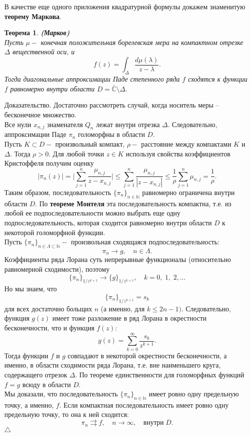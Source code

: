 \documentclass[12pt,a4paper]{article}
\theoremstyle{plain}   \newtheorem{Pro}{Задача}
\newtheorem{The}{Теорема}
\begin{document}
В качестве еще одного приложения квадратурной формулы
докажем знаменитую
{\bfseries теорему Маркова}.
\begin{The}
{\bfseries (Марков)}
\\
Пусть
$ \mu - $
конечная положительная борелевская мера на компактном отрезке
$ \Delta $
вещественной оси, и
$$
  f(z)=\int _{\Delta}
  \frac{d \mu (\lambda )}{z-\lambda}.
$$
Тогда диагональные аппроксимации Паде степенного ряда
$ f $
сходятся к функции
$ f $
равномерно внутри области
$ D= \bar{\mathbb{C}} \setminus \Delta . $
\end{The}
{\Large Доказательство.}
Достаточно рассмотреть случай, когда носитель меры --
бесконечное множество.\\
Все нули
$ x_{n,j} $
знаменателя
$ Q_n $
лежат внутри отрезка
$ \Delta . $
Следовательно, аппроксимации Паде
$ \pi _n $
голоморфны в области
$ D . $
\\
Пусть
$ K \subset D - $
произвольный компакт,
$ \rho - $
расстояние между компактами
$ K $
и
$ \Delta . $
Тогда
$ \rho >0 . $
Для любой точки
$ z \in K $
используя свойства коэффициентов Кристоффеля получим оценку
$$
  | \pi _n (z) |=
  \biggl | \sum _{j=1}^n
  \frac{\mu _{n,j}}{z-x_{n,j}} \biggr | \leq
  \sum _{j=1}^n \frac{\mu _{n,j}}{|z-x_{n,j}|} \leq
  \frac{1}{\rho} \sum _{j=1}^n \mu _{n,j} =\frac{1}{\rho}.
$$
Таким образом, последовательность
$ \{ \pi _n \} _{n \in \mathbb{N}} $
равномерно ограничена внутри области
$ D . $
По
{\bfseries теореме Монтеля}
эта последовательность компактна, т.е.
из любой ее подпоследовательности можно выбрать еще
одну подпоследовательность, которая сходится равномерно
внутри области
$ D $
к некоторой голоморфной функции.\\
Пусть
$ \{ \pi _n \} _{ n \in \Lambda \subset \mathbb{N}} - $
произвольная сходящаяся подпоследовательность:
$$
  \pi _n \rightarrow g , \quad n \in \Lambda .
$$
Коэффициенты ряда Лорана суть непрерывные функционалы
(относительно равномерной сходимости), поэтому
$$
  \{ \pi _n \} _{1/z^{k+1}}
  \rightarrow
  \{ g \} _{1/z^{k+1}},
  \quad k=0, \; 1, \; 2,...
$$
Но мы знаем, что
$$
  \{ \pi _n \} _{1/z^{k+1}} =s_k
$$
для всех достаточно больщих
$ n $
(а именно, для
$ k \leq 2n-1 ) . $
Следовательно, функция
$ g(z) $
имеет тоже разложение в ряд Лорана в окрестности бесконечности, что и
функция
$ f(z) : $
$$
  g(z)= \sum _{k=0}^{\infty}
  \frac{s_k}{z^{k+1}} .
$$
Тогда функции
$ f $
и
$ g $
совпадают в некоторой окрестности бесконечности, а именно,
в области сходимости ряда Лорана, т.е. вне наименьшего
круга, содержащего отрезок
$ \Delta . $
По теореме единственности для голоморфных функций
$ f=g $
всюду в области
$ D . $
\\
Мы доказали, что последовательность
$ \{ \pi _n \} _{n \in \mathbb{N}} $
имеет ровно одну предельную точку, а именно,
$ f . $
Если компактная последовательность имеет ровно одну
предельную точку, то она к ней сходится:
$$
  \pi _n \rightrightarrows f , \quad
  n \rightarrow \infty , \quad
  внутри \; D .
$$
$ \triangle $
\\
\end{document}
